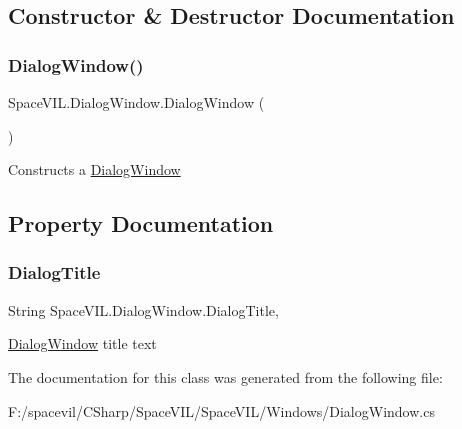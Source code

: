 \subsection{Constructor \& Destructor Documentation}
\mbox{\label{class_space_v_i_l_1_1_dialog_window_afe7940f2348ea9f8d760c2b7ce4877c2}} 
\subsubsection{\texorpdfstring{Dialog\+Window()}{DialogWindow()}}
{\footnotesize\ttfamily Space\+V\+I\+L.\+Dialog\+Window.\+Dialog\+Window (\begin{DoxyParamCaption}{ }\end{DoxyParamCaption})\hspace{0.3cm}{\ttfamily [inline]}}



Constructs a \mbox{\hyperlink{class_space_v_i_l_1_1_dialog_window}{Dialog\+Window}} 



\subsection{Property Documentation}
\mbox{\label{class_space_v_i_l_1_1_dialog_window_a91fb9fd6d98afaad9d89a88891bb3250}} 
\subsubsection{\texorpdfstring{Dialog\+Title}{DialogTitle}}
{\footnotesize\ttfamily String Space\+V\+I\+L.\+Dialog\+Window.\+Dialog\+Title\hspace{0.3cm}{\ttfamily [get]}, {\ttfamily [set]}}



\mbox{\hyperlink{class_space_v_i_l_1_1_dialog_window}{Dialog\+Window}} title text 



The documentation for this class was generated from the following file\+:\begin{DoxyCompactItemize}
\item 
F\+:/spacevil/\+C\+Sharp/\+Space\+V\+I\+L/\+Space\+V\+I\+L/\+Windows/Dialog\+Window.\+cs\end{DoxyCompactItemize}
